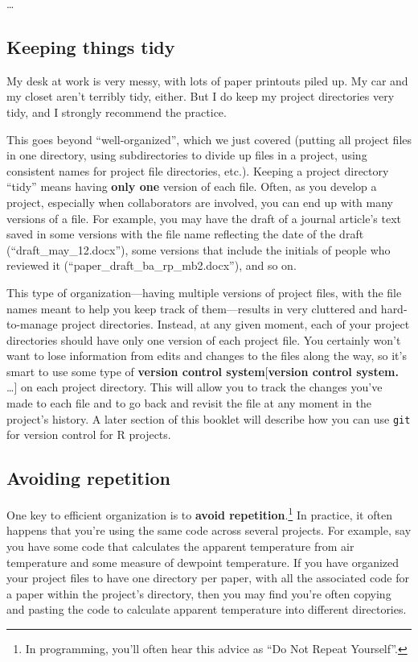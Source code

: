 \documentclass[]{tufte-book}
\begin{document}
\ldots{}

\hypertarget{keeping-things-tidy}{%
\subsection{Keeping things tidy}\label{keeping-things-tidy}}

My desk at work is very messy, with lots of paper printouts piled up. My car and my closet
aren't terribly tidy, either. But I do keep my project directories very tidy, and I
strongly recommend the practice.

This goes beyond ``well-organized'', which we just covered (putting all project
files in one directory, using subdirectories to divide up files in a project,
using consistent names for project file directories, etc.). Keeping a project directory
``tidy'' means having \textbf{only one} version of each file. Often, as you develop a project,
especially when collaborators are involved, you can end up with many versions of a
file. For example, you may have the draft of a journal article's text saved
in some versions with the file name reflecting the date of the draft (``draft\_may\_12.docx''),
some versions that include the initials of people who reviewed it (``paper\_draft\_ba\_rp\_mb2.docx''),
and so on.

This type of organization---having multiple versions of project files, with the file names
meant to help you keep track of them---results in very cluttered and hard-to-manage project
directories. Instead, at any given moment, each of your project directories should have only
one version of each project file. You certainly won't want to lose information from edits
and changes to the files along the way, so it's smart to use some type of \textbf{version control
system}{[}\textbf{version control system.} \ldots{}{]} on each project directory. This will allow you
to track the changes you've made to each file and to go back and revisit the file at any
moment in the project's history. A later section of this booklet will describe how you can
use \texttt{git} for version control for R projects.

\hypertarget{avoiding-repetition}{%
\subsection{Avoiding repetition}\label{avoiding-repetition}}

One key to efficient organization is to \textbf{avoid repetition}.\footnote{In programming, you'll often
  hear this advice as ``Do Not Repeat Yourself''.} In practice, it often happens that you're using the
same code across several projects. For example, say you have some code that calculates the
apparent temperature from air temperature and some measure of dewpoint temperature. If you have
organized your project files to have one directory per paper, with all the associated code for
a paper within the project's directory, then you may find you're often copying and pasting the
code to calculate apparent temperature into different directories.
\end{document}
